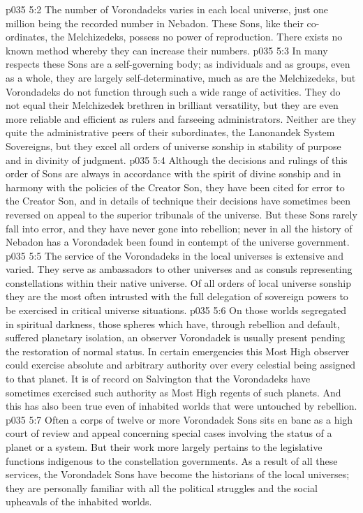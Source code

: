 \vs p035 5:2 \pc The number of Vorondadeks varies in each local universe, just one million being the recorded number in Nebadon. These Sons, like their co\hyp{}ordinates, the Melchizedeks, possess no power of reproduction. There exists no known method whereby they can increase their numbers.
\vs p035 5:3 \pc In many respects these Sons are a self\hyp{}governing body; as individuals and as groups, even as a whole, they are largely self\hyp{}determinative, much as are the Melchizedeks, but Vorondadeks do not function through such a wide range of activities. They do not equal their Melchizedek brethren in brilliant versatility, but they are even more reliable and efficient as rulers and farseeing administrators. Neither are they quite the administrative peers of their subordinates, the Lanonandek System Sovereigns, but they excel all orders of universe sonship in stability of purpose and in divinity of judgment.
\vs p035 5:4 Although the decisions and rulings of this order of Sons are always in accordance with the spirit of divine sonship and in harmony with the policies of the Creator Son, they have been cited for error to the Creator Son, and in details of technique their decisions have sometimes been reversed on appeal to the superior tribunals of the universe. But these Sons rarely fall into error, and they have never gone into rebellion; never in all the history of Nebadon has a Vorondadek been found in contempt of the universe government.
\vs p035 5:5 The service of the Vorondadeks in the local universes is extensive and varied. They serve as ambassadors to other universes and as consuls representing constellations within their native universe. Of all orders of local universe sonship they are the most often intrusted with the full delegation of sovereign powers to be exercised in critical universe situations.
\vs p035 5:6 On those worlds segregated in spiritual darkness, those spheres which have, through rebellion and default, suffered planetary isolation, an observer Vorondadek is usually present pending the restoration of normal status. In certain emergencies this Most High observer could exercise absolute and arbitrary authority over every celestial being assigned to that planet. It is of record on Salvington that the Vorondadeks have sometimes exercised such authority as Most High regents of such planets. And this has also been true even of inhabited worlds that were untouched by rebellion.
\vs p035 5:7 Often a corps of twelve or more Vorondadek Sons sits en banc as a high court of review and appeal concerning special cases involving the status of a planet or a system. But their work more largely pertains to the legislative functions indigenous to the constellation governments. As a result of all these services, the Vorondadek Sons have become the historians of the local universes; they are personally familiar with all the political struggles and the social upheavals of the inhabited worlds.
